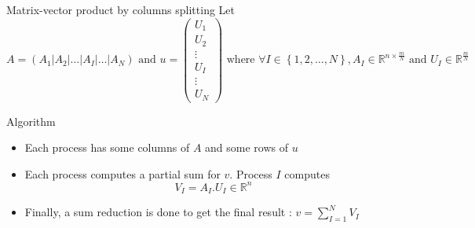 \documentclass[compress,10pt,aspectratio=169]{beamer}
\begin{document}
\begin{frame}[fragile]{Matrix-vector product by columns splitting}
  \scriptsize
  Let
  \[
    A = \left(A_{1}|A_{2}|\ldots|A_{I}|\ldots|A_{N}\right)\mbox{ and }
    u=\left(\begin{array}{c}
      U_{1} \\ \hline
      U_{2} \\ \hline
      \vdots \\ \hline
      U_{I} \\ \hline
      \vdots \\ \hline
      U_{N}
    \end{array} \right)
    \mbox{ where } \forall I\in\left\{1,2,\ldots,N\right\}, A_{I}\in\mathbb{R}^{n\times \frac{m}{N}}\mbox{ and } U_{I}\in\mathbb{R}^{\frac{m}{N}}
    \]

    \begin{exampleblock}{Algorithm}
      \begin{itemize}
      \item Each process has some columns of $A$ and some rows of $u$
      \item Each process computes a partial sum for $v$. Process $I$ computes
        \[
        V_{I} = A_{I}.U_{I}\in\mathbb{R}^{n}
        \]
      \item Finally, a sum reduction is done to get the final result :
        $\displaystyle
        v = \sum_{I=1}^{N}V_{I}
        $
      \end{itemize}
    \end{exampleblock}
    
\end{frame}
\end{document}
